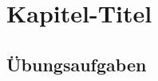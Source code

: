 %
%
%
\chapter{Kapitel-Titel
\label{buch:chapter:titel}}
\kopfrechts{}

%

\section*{Übungsaufgaben}
\begin{uebungsaufgaben}
\end{uebungsaufgaben}

